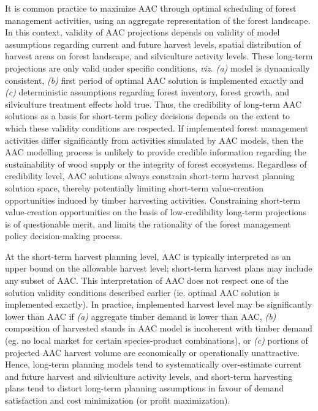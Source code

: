 It is common practice to maximize AAC through optimal scheduling of
forest management activities, using an aggregate representation of the
forest landscape. In this context, validity of AAC projections depends
on validity of model assumptions regarding current and future harvest
levels, spatial distribution of harvest areas on forest landscape, and
silviculture activity levels. These long-term projections are only
valid under specific conditions, \emph{viz. (a) }model is dynamically
consistent, \emph{(b)} first period of optimal AAC solution is implemented exactly and
\emph{(c)} deterministic assumptions regarding forest inventory,
forest growth, and silviculture treatment effects hold true. Thus,
the credibility of long-term AAC solutions as a basis for short-term policy
decisions depends on the extent to which these validity conditions are
respected.  If implemented forest management activities differ
significantly from activities simulated by AAC models, then the AAC
modelling process is unlikely to provide credible information
regarding the sustainability of wood supply or the integrity of forest
ecosystems. Regardless of credibility level, AAC solutions always
constrain short-term harvest planning solution space, thereby
potentially limiting short-term value-creation opportunities induced
by timber harvesting activities. Constraining short-term
value-creation opportunities on the basis of low-credibility long-term
projections is of questionable merit, and limits the rationality of
the forest management policy decision-making process.

At the short-term harvest planning level, AAC is typically interpreted
as an upper bound on the allowable harvest level; short-term harvest plans
may include any subset of AAC. This interpretation of AAC does not
respect one of the solution validity conditions described earlier
(ie. optimal AAC solution is implemented exactly). In practice,
implemented harvest level may be significantly lower than AAC if
\emph{(a)} aggregate timber demand is lower than AAC, \emph{(b)}
composition of harvested stands in AAC model is incoherent with timber
demand (eg. no local market for certain species-product combinations),
or \emph{(c)} portions of projected AAC harvest volume are
economically or operationally unattractive. Hence, long-term planning
models tend to systematically over-estimate current and future harvest
and silviculture activity levels, and short-term harvesting plans tend
to distort long-term planning assumptions in favour of demand
satisfaction and cost minimization (or profit maximization).

